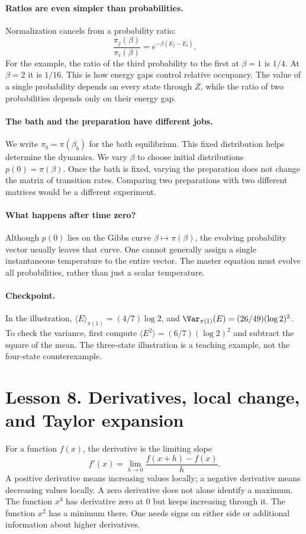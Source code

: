 \paragraph{Ratios are even simpler than probabilities.}
Normalization cancels from a probability ratio:
\[
\frac{\pi_j(\beta)}{\pi_i(\beta)}
=e^{-\beta(E_j-E_i)}.
\]
For the example, the ratio of the third probability to the first at $\beta=1$
is $1/4$. At $\beta=2$ it is $1/16$. This is how energy gaps control relative
occupancy. The value of a single probability depends on every state through
$Z$, while the ratio of two probabilities depends only on their energy gap.

\paragraph{The bath and the preparation have different jobs.}
We write $\pi_b=\pi(\beta_b)$ for the bath equilibrium. This fixed distribution
helps determine the dynamics. We vary $\beta$ to choose initial distributions
$p(0)=\pi(\beta)$. Once the bath is fixed, varying the preparation does not
change the matrix of transition rates. Comparing two preparations with two
different matrices would be a different experiment.

\paragraph{What happens after time zero?}
Although $p(0)$ lies on the Gibbs curve $\beta\mapsto\pi(\beta)$, the evolving
probability vector usually leaves that curve. One cannot generally assign a
single instantaneous temperature to the entire vector. The master equation
must evolve all probabilities, rather than just a scalar temperature.

\paragraph{Checkpoint.}
In the illustration,
$\langle E\rangle_{\pi(1)}=(4/7)\log2$, and
$\Var_{\pi(1)}(E)=(26/49)(\log2)^2$. To check the variance, first compute
$\langle E^2\rangle=(6/7)(\log2)^2$ and subtract the square of the mean.
The three-state illustration is a teaching example, not the four-state
counterexample.

\clearpage
\section*{Lesson 8. Derivatives, local change, and Taylor expansion}
For a function $f(x)$, the derivative is the limiting slope
\[
f'(x)=\lim_{h\to0}\frac{f(x+h)-f(x)}{h}.
\]
A positive derivative means increasing values locally; a negative derivative
means decreasing values locally. A zero derivative does not alone identify a
maximum. The function $x^3$ has derivative zero at $0$ but keeps increasing
through it. The function $x^2$ has a minimum there. One needs signs on either
side or additional information about higher derivatives.

